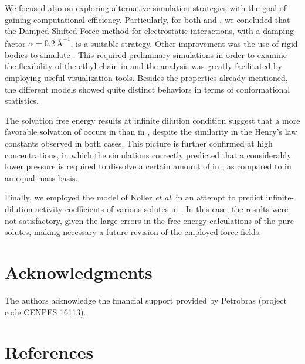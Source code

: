 \documentclass[3p,twocolumn]{elsarticle}
\begin{document}
We focused also on exploring alternative simulation strategies with the goal of gaining computational efficiency.
Particularly, for both \ce{[emim][B(CN)_4]} and \ce{[emim][NTf_2]}, we concluded that the Damped-Shifted-Force method for electrostatic interactions, with a damping factor $\alpha = 0.2 ~\text{\AA}^{-1}$, is a suitable strategy.
Other improvement was the use of rigid bodies to simulate \ce{[emim][B(CN)_4]}.
This required preliminary simulations in order to examine the flexibility of the ethyl chain in \ce{[emim]^+} and the analysis was greatly facilitated by employing useful visualization tools.
Besides the properties already mentioned, the different models showed quite distinct behaviors in terms of conformational statistics.

The solvation free energy results at infinite dilution condition suggest that a more favorable solvation of  occurs in \ce{[emim][B(CN)_4]} than in \ce{[emim][NTf_2]}, despite the similarity in the Henry's law constants observed in both cases.
This picture is further confirmed at high  concentrations, in which the simulations correctly predicted that a considerably lower pressure is required to dissolve a certain amount of  in \ce{[emim][B(CN)_4]}, as compared to \ce{[emim][NTf_2]} in an equal-mass basis.

Finally, we employed the model of Koller \textit{et al}. \cite{Koller_2012} in an attempt to predict infinite-dilution activity coefficients of various solutes in \ce{[emim][B(CN)_4]}.
In this case, the results were not satisfactory, given the large errors in the free energy calculations of the pure solutes, making necessary a future revision of the employed force fields.

\section*{Acknowledgments}

The authors acknowledge the financial support provided by Petrobras (project code CENPES 16113). 

\section*{References}


\end{document}

